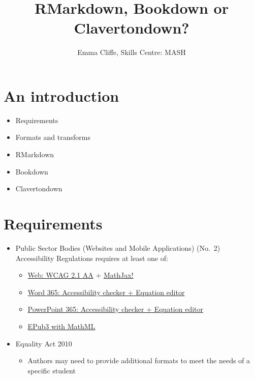 \documentclass[
  10pt,
  a4paper]{article}
\title{RMarkdown, Bookdown or Clavertondown?}
\author{Emma Cliffe, Skills Centre: MASH}
\date{}
\providecommand{\tightlist}{%
  \setlength{\itemsep}{0pt}\setlength{\parskip}{0pt}}
\begin{document}
\maketitle

{
\hypersetup{linkcolor=}
\setcounter{tocdepth}{2}
\tableofcontents
}
\newpage
{}

\hypertarget{an-introduction}{%
\section*{An introduction}\label{an-introduction}}

\begin{itemize}
\tightlist
\item
  Requirements
\item
  Formats and transforms
\item
  RMarkdown
\item
  Bookdown
\item
  Clavertondown
\end{itemize}

\hypertarget{requirements}{%
\section{Requirements}\label{requirements}}

\begin{itemize}
\tightlist
\item
  Public Sector Bodies (Websites and Mobile Applications) (No.~2) Accessibility Regulations requires at least one of:

  \begin{itemize}
  \tightlist
  \item
    \href{https://accessibilityinsights.io/docs/en/web/overview}{Web: WCAG 2.1 AA} + \href{https://docs.mathjax.org/en/v2.7-latest/misc/accessibility-features.html}{MathJax!}
  \item
    \href{https://support.office.com/en-gb/article/make-your-word-documents-accessible-to-people-with-disabilities-d9bf3683-87ac-47ea-b91a-78dcacb3c66d}{Word 365: Accessibility checker + Equation editor}
  \item
    \href{https://support.microsoft.com/en-us/office/make-your-powerpoint-presentations-accessible-to-people-with-disabilities-6f7772b2-2f33-4bd2-8ca7-dae3b2b3ef25}{PowerPoint 365: Accessibility checker + Equation editor}
  \item
    \href{https://docs.mathjax.org/en/v2.7-latest/misc/epub.html}{EPub3 with MathML}
  \end{itemize}
\item
  Equality Act 2010

  \begin{itemize}
  \tightlist
  \item
    Authors may need to provide additional formats to meet the needs of a specific student
  \end{itemize}
\end{itemize}
\end{document}
